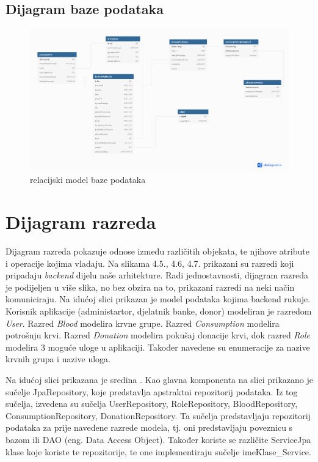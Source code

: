 			\subsection{Dijagram baze podataka}
				\begin{figure}[H]
	\centering
	\includegraphics[width=\textwidth, scale=2.0]{dijagrami/relShema.png}
	\caption{relacijski model baze podataka}
	\label{fig:dijagram_baze}
\end{figure}
			\eject
			
		\section{Dijagram razreda}
		
	Dijagram razreda pokazuje odnose između različitih objekata, te njihove atribute i operacije kojima vladaju. Na slikama 4.5., 4.6, 4.7. prikazani su razredi koji pripadaju \textit{backend} dijelu naše arhitekture. Radi jednostavnosti, dijagram razreda je podijeljen u više slika, no bez obzira na to, prikazani razredi na neki način komuniciraju.
	Na idućoj slici prikazan je model podataka kojima backend rukuje. Korisnik aplikacije (administartor, djelatnik banke, donor) modeliran je razredom \textit{User}. Razred \textit{Blood} modelira krvne grupe. Razred \textit{Consumption} modelira potrošnju krvi. Razred \textit{Donation} modelira pokušaj donacije krvi, dok razred \textit{Role} modelira 3 moguće uloge u aplikaciji. Također navedene su enumeracije za nazive krvnih grupa i nazive uloga.
		
	\eject
	Na idućoj slici prikazana je sredina . Kao glavna komponenta na slici prikazano je sučelje JpaRepository, koje predstavlja apstraktni repozitorij podataka. Iz tog sučelja, izvedena su sučelja UserRepository, RoleRepository, BloodRepository, ConsumptionRepository, DonationRepository. Ta sučelja predstavljaju repozitorij podataka za prije navedene razrede modela, tj. oni predstavljaju poveznicu s bazom ili DAO (eng. Data Access Object). Također koriste se različite ServiceJpa klase koje koriste te repozitorije, te one implementiraju sučelje imeKlase_Service. 
	
